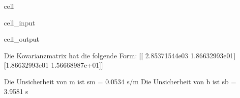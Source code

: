 \documentclass[letterpaper,10pt,english]{jupyterBook}
\begin{document}
\begin{sphinxuseclass}{cell}\begin{sphinxVerbatimInput}

\begin{sphinxuseclass}{cell_input}
\begin{sphinxVerbatim}[commandchars=\\\{\}]
 \PYG{p}{[}\PYG{p}{]}
 \PYG{p}{[}\PYG{p}{]}\PYG{p}{[}\PYG{p}{]}\PYG{p}{[}\PYG{p}{]}
 \PYG{p}{[}\PYG{p}{]}\PYG{p}{[}\PYG{p}{]}\PYG{p}{[}\PYG{p}{]}
\end{sphinxVerbatim}

\end{sphinxuseclass}\end{sphinxVerbatimInput}
\begin{sphinxVerbatimOutput}

\begin{sphinxuseclass}{cell_output}
\begin{sphinxVerbatim}[commandchars=\\\{\}]
Die Kovarianzmatrix hat die folgende Form: 
 [[ 2.85371544e\PYGZhy{}03 \PYGZhy{}1.86632993e\PYGZhy{}01]
 [\PYGZhy{}1.86632993e\PYGZhy{}01  1.56668987e+01]]

Die Unsicherheit von m ist 	 s\PYGZus{}m = 0.0534 s/m
Die Unsicherheit von b ist 	 s\PYGZus{}b = 3.9581 s
\end{sphinxVerbatim}

\end{sphinxuseclass}\end{sphinxVerbatimOutput}

\end{sphinxuseclass}
\end{document}
